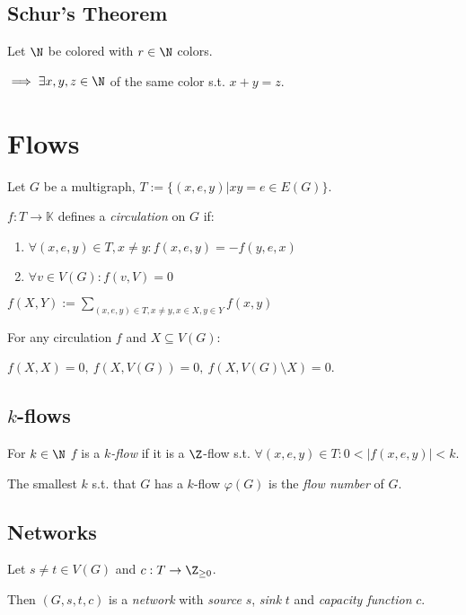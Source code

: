 \subsection*{Schur's Theorem}

Let $\N$ be colored with $r \in \N$ colors.

$\implies \exists x, y, z \in \N$ of the same color s.t. $x+y=z$.

\section*{Flows}

Let $G$ be a multigraph, $T := \{(x,e,y) | xy = e \in E(G)\}$.

$f : T \to \mathbb{K}$ defines a \emph{circulation} on $G$ if:

\begin{enumerate}
	\item $\forall (x,e,y) \in T, x \neq y : f(x,e,y) = -f(y,e,x)$
	\item $\forall v \in V(G) : f(v,V) = 0$
\end{enumerate}

$f(X,Y) := \displaystyle\sum_{(x,e,y) \in T, x \neq y, x \in X, y \in Y} f(x,y)$

\spacing

For any circulation $f$ and $X \subseteq V(G)$:

$f(X,X)=0, \ f(X,V(G))=0, \ f(X,V(G) \setminus X)=0$.

\subsection*{$k$-flows}

For $k \in \N$ $f$ is a \emph{$k$-flow} if it is a $\Z$-flow s.t. $\forall (x,e,y) \in T : 0 < |f(x,e,y)| < k$.

\spacing

The smallest $k$ s.t. that $G$ has a $k$-flow $\varphi(G)$ is the \emph{flow number} of $G$.

\subsection*{Networks}

Let $s \neq t \in V(G)$ and $c : T \to \Z_{\geq0}$.

Then $(G,s,t,c)$ is a \emph{network} with \emph{source} $s$, \emph{sink} $t$ and \emph{capacity function} $c$.

\spacing

